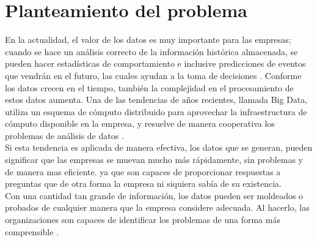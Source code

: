 \section{Planteamiento del problema}
En la actualidad, el valor de los datos es muy importante para las empresas; cuando se hace un análisis correcto de la información histórica almacenada, se pueden hacer estadísticas de comportamiento e inclusive predicciones de eventos que vendrán en el futuro, las cuales ayudan a la toma de decisiones \cite{Baz}. Conforme los datos crecen en el tiempo, también la complejidad en el procesamiento de estos datos aumenta. Una de las tendencias de años recientes, llamada Big Data, utiliza un esquema de cómputo distribuido para aprovechar la infraestructura de cómputo disponible en la empresa, y resuelve de manera cooperativa los problemas de análisis de datos \cite{refi}. 
\\
Si esta tendencia es aplicada de manera efectiva, los datos que se generan, pueden significar que las empresas se muevan mucho más rápidamente, sin problemas y de manera mas eficiente. ya que son capaces de proporcionar respuestas a preguntas que de otra forma la empresa ni siquiera sabía de su existencia.
\\
Con una cantidad tan grande de información, los datos pueden ser moldeados o probados de cualquier manera que la empresa considere adecuada. Al hacerlo, las organizaciones son capaces de identificar los problemas de una forma más comprensible \cite{refi2}. 
\\
